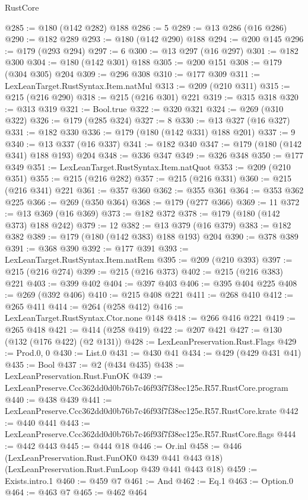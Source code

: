 \begin{lexlean}{RustCore}
\begin{coremodule}
@285 := @180 (@142 @282) @188
@286 := 5
@289 := @13 @286 (@16 @286)
@290 := @182 @289
@293 := @180 (@142 @290) @188
@294 := @200 @145
@296 := @179 (@293 @294)
@297 := 6
@300 := @13 @297 (@16 @297)
@301 := @182 @300
@304 := @180 (@142 @301) @188
@305 := @200 @151
@308 := @179 (@304 @305) @204
@309 := @296 @308
@310 := @177 @309
@311 := LexLeanTarget.RustSyntax.Item.natMul
@313 := @209 (@210 @311)
@315 := @215 (@216 @290)
@318 := @215 (@216 @301) @221
@319 := @315 @318
@320 := @313 @319
@321 := Bool.true
@322 := @320 @321
@324 := @269 (@310 @322)
@326 := @179 (@285 @324)
@327 := 8
@330 := @13 @327 (@16 @327)
@331 := @182 @330
@336 := @179 (@180 (@142 @331) @188 @201)
@337 := 9
@340 := @13 @337 (@16 @337)
@341 := @182 @340
@347 := @179 (@180 (@142 @341) @188 @193) @204
@348 := @336 @347
@349 := @326 @348
@350 := @177 @349
@351 := LexLeanTarget.RustSyntax.Item.natQuot
@353 := @209 (@210 @351)
@355 := @215 (@216 @282)
@357 := @215 (@216 @331)
@360 := @215 (@216 @341) @221
@361 := @357 @360
@362 := @355 @361
@364 := @353 @362 @225
@366 := @269 (@350 @364)
@368 := @179 (@277 @366)
@369 := 11
@372 := @13 @369 (@16 @369)
@373 := @182 @372
@378 := @179 (@180 (@142 @373) @188 @242)
@379 := 12
@382 := @13 @379 (@16 @379)
@383 := @182 @382
@389 := @179 (@180 (@142 @383) @188 @193) @204
@390 := @378 @389
@391 := @368 @390
@392 := @177 @391
@393 := LexLeanTarget.RustSyntax.Item.natRem
@395 := @209 (@210 @393)
@397 := @215 (@216 @274)
@399 := @215 (@216 @373)
@402 := @215 (@216 @383) @221
@403 := @399 @402
@404 := @397 @403
@406 := @395 @404 @225
@408 := @269 (@392 @406)
@410 := @215 @408 @221
@411 := @268 @410
@412 := @265 @411
@414 := @264 (@258 @412)
@416 := LexLeanTarget.RustSyntax.Ctor.none @148
@418 := @266 @416 @221
@419 := @265 @418
@421 := @414 (@258 @419)
@422 := @207 @421
@427 := @130 (@132 (@176 @422) (@2 @131))
@428 := LexLeanPreservation.Rust.Flags
@429 := Prod.{0, 0}
@430 := List.{0}
@431 := @430 @41
@434 := @429 (@429 @431 @41)
@435 := Bool
@437 := @2 (@434 @435)
@438 := LexLeanPreservation.Rust.FunOK
@439 := LexLeanPreserve.Ccc362dd0d0b76b7c46f93f7f38ec125e.R57.RustCore.program
@440 := @438 @439
@441 := LexLeanPreserve.Ccc362dd0d0b76b7c46f93f7f38ec125e.R57.RustCore.krate
@442 := @440 @441
@443 := LexLeanPreserve.Ccc362dd0d0b76b7c46f93f7f38ec125e.R57.RustCore.flags
@444 := @442 @443
@445 := @444 @18
@446 := Or.inl
@458 := @446
    (LexLeanPreservation.Rust.FunOK0 @439 @441 @443 @18)
    (LexLeanPreservation.Rust.FunLoop @439 @441 @443 @18)
@459 := Exists.intro.{1}
@460 := @459 @7
@461 := And
@462 := Eq.{1}
@463 := Option.{0}
@464 := @463 @7
@465 := @462 @464

\end{coremodule}
\end{lexlean}
